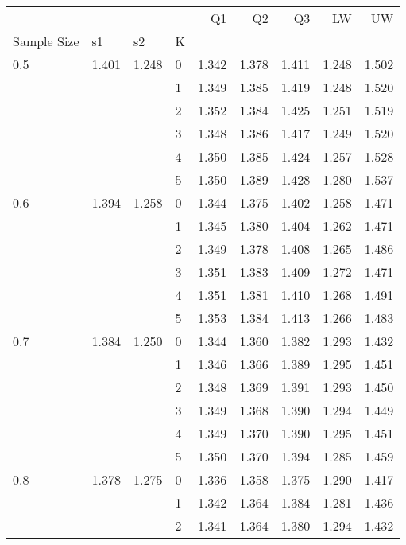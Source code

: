 \begin{tabular}{llllrrrrr}
\toprule
    &       &       &   &     Q1 &     Q2 &     Q3 &     LW &     UW \\
Sample Size & s1 & s2 & K &        &        &        &        &        \\
\midrule
0.5 & 1.401 & 1.248 & 0 &  1.342 &  1.378 &  1.411 &  1.248 &  1.502 \\
    &       &       & 1 &  1.349 &  1.385 &  1.419 &  1.248 &  1.520 \\
    &       &       & 2 &  1.352 &  1.384 &  1.425 &  1.251 &  1.519 \\
    &       &       & 3 &  1.348 &  1.386 &  1.417 &  1.249 &  1.520 \\
    &       &       & 4 &  1.350 &  1.385 &  1.424 &  1.257 &  1.528 \\
    &       &       & 5 &  1.350 &  1.389 &  1.428 &  1.280 &  1.537 \\
0.6 & 1.394 & 1.258 & 0 &  1.344 &  1.375 &  1.402 &  1.258 &  1.471 \\
    &       &       & 1 &  1.345 &  1.380 &  1.404 &  1.262 &  1.471 \\
    &       &       & 2 &  1.349 &  1.378 &  1.408 &  1.265 &  1.486 \\
    &       &       & 3 &  1.351 &  1.383 &  1.409 &  1.272 &  1.471 \\
    &       &       & 4 &  1.351 &  1.381 &  1.410 &  1.268 &  1.491 \\
    &       &       & 5 &  1.353 &  1.384 &  1.413 &  1.266 &  1.483 \\
0.7 & 1.384 & 1.250 & 0 &  1.344 &  1.360 &  1.382 &  1.293 &  1.432 \\
    &       &       & 1 &  1.346 &  1.366 &  1.389 &  1.295 &  1.451 \\
    &       &       & 2 &  1.348 &  1.369 &  1.391 &  1.293 &  1.450 \\
    &       &       & 3 &  1.349 &  1.368 &  1.390 &  1.294 &  1.449 \\
    &       &       & 4 &  1.349 &  1.370 &  1.390 &  1.295 &  1.451 \\
    &       &       & 5 &  1.350 &  1.370 &  1.394 &  1.285 &  1.459 \\
0.8 & 1.378 & 1.275 & 0 &  1.336 &  1.358 &  1.375 &  1.290 &  1.417 \\
    &       &       & 1 &  1.342 &  1.364 &  1.384 &  1.281 &  1.436 \\
    &       &       & 2 &  1.341 &  1.364 &  1.380 &  1.294 &  1.432 \\

\end{tabular}
